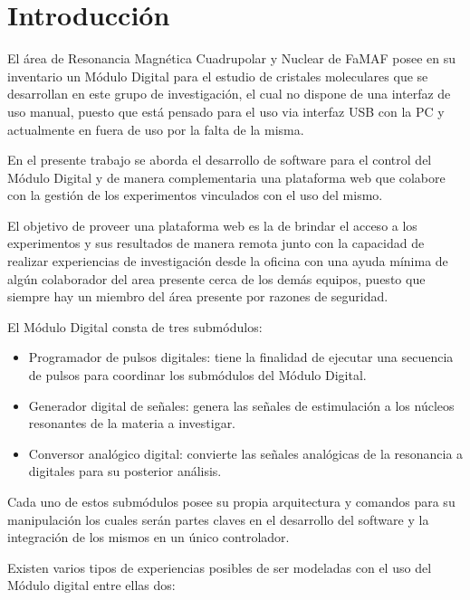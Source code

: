 \section{Introducci\'on}

El \'area de Resonancia Magn\'etica Cuadrupolar
y Nuclear de FaMAF posee en su inventario un M\'odulo Digital
para el estudio de cristales moleculares que se desarrollan 
en este grupo de investigaci\'on, el cual no dispone de una 
interfaz de uso manual, puesto que est\'a pensado para el 
uso via interfaz USB con la PC y actualmente en fuera 
de uso por la falta de la misma.

En el presente trabajo se aborda el desarrollo de software para
el control del M\'odulo Digital y de manera complementaria una
plataforma web que colabore con la gesti\'on de los experimentos 
vinculados con el uso del mismo.

El objetivo de proveer una plataforma web es la de brindar el acceso 
a los experimentos y sus resultados de manera remota junto con 
la capacidad de realizar experiencias de investigaci\'on desde la oficina
con una ayuda m\'inima de alg\'un colaborador del area presente cerca
de los dem\'as equipos, puesto que siempre hay un miembro del \'area presente
por razones de seguridad.

El Módulo Digital consta de tres submódulos:

\begin{itemize}

   \item Programador de pulsos digitales: tiene la finalidad 
   de ejecutar una secuencia de pulsos para coordinar los 
   subm\'odulos del M\'odulo Digital.

   \item Generador digital de se\~nales: genera las se\~nales de 
   estimulaci\'on a los n\'ucleos resonantes de la materia a investigar.

   \item Conversor anal\'ogico digital: convierte las 
   se\~nales anal\'ogicas de la resonancia a digitales
   para su posterior an\'alisis.

\end{itemize}

Cada uno de estos subm\'odulos posee su propia arquitectura y comandos 
para su manipulaci\'on los cuales ser\'an partes claves en el desarrollo del 
software y la integraci\'on de los mismos en un \'unico controlador.

Existen varios tipos de experiencias posibles de ser modeladas 
con el uso del M\'odulo digital entre ellas dos:

